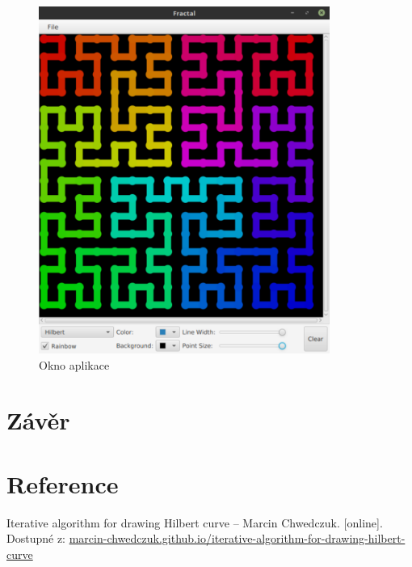\documentclass[12pt]{scrartcl}
\begin{document}
\begin{figure}[!ht]
	\centering
	\label{obr:polekolizi}
	\includegraphics[width=0.85\textwidth,natwidth=1,natheight=1]{app_gui.pdf}
	\caption{Okno aplikace}
\end{figure}

\newpage
\section{Závěr}
\paragraph{}


\section{Reference}
Iterative algorithm for drawing Hilbert curve – Marcin Chwedczuk. [online].\\ Dostupné z: \href{https://marcin-chwedczuk.github.io/iterative-algorithm-for-drawing-hilbert-curve}{marcin-chwedczuk.github.io/iterative-algorithm-for-drawing-hilbert-curve}
\end{document}
